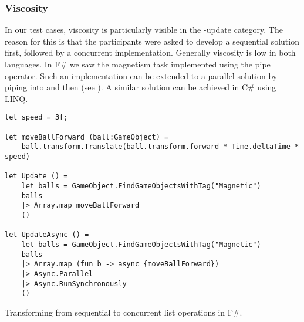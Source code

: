 \subsubsection{Viscosity}
In our test cases, viscosity is particularly visible in the -update category. The reason for this is that the participants were asked to develop a sequential solution first, followed by a concurrent implementation. Generally viscosity is low in both languages. In F\# we saw the magnetism task implemented using the pipe operator. Such an implementation can be extended to a parallel solution by piping into  and then  (see ). A similar solution can be achieved in C\# using \gls{LINQ}.

\begin{listing}[H]
    \begin{verbatim}
let speed = 3f;

let moveBallForward (ball:GameObject) =
    ball.transform.Translate(ball.transform.forward * Time.deltaTime * speed)

let Update () =
    let balls = GameObject.FindGameObjectsWithTag("Magnetic")
    balls
    |> Array.map moveBallForward
    ()

let UpdateAsync () =
    let balls = GameObject.FindGameObjectsWithTag("Magnetic")
    balls
    |> Array.map (fun b -> async {moveBallForward})
    |> Async.Parallel
    |> Async.RunSynchronously
    ()
    \end{verbatim}
    \caption{Transforming from sequential to concurrent list operations in F\#.}
    \label{lst:fsharp:pipe:async}
\end{listing}

